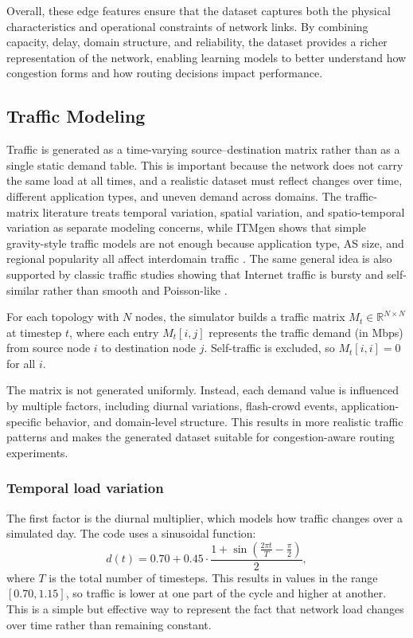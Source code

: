 \documentclass[12pt]{article}
\begin{document}
Overall, these edge features ensure that the dataset captures both the physical characteristics and operational constraints of network links. By combining capacity, delay, domain structure, and reliability, the dataset provides a richer representation of the network, enabling learning models to better understand how congestion forms and how routing decisions impact performance.

\subsection{Traffic Modeling}
Traffic is generated as a time-varying source–destination matrix rather than as a single static demand table. This is important because the network does not carry the same load at all times, and a realistic dataset must reflect changes over time, different application types, and uneven demand across domains. The traffic-matrix literature treats temporal variation, spatial variation, and spatio-temporal variation as separate modeling concerns, while ITMgen shows that simple gravity-style traffic models are not enough because application type, AS size, and regional popularity all affect interdomain traffic \cite{itmgen}. The same general idea is also supported by classic traffic studies showing that Internet traffic is bursty and self-similar rather than smooth and Poisson-like \cite{ethernetTraffic}.

For each topology with $N$ nodes, the simulator builds a traffic matrix 
$M_t \in \mathbb{R}^{N \times N}$ at timestep $t$, where each entry 
$M_t[i,j]$ represents the traffic demand (in Mbps) from source node $i$ 
to destination node $j$. Self-traffic is excluded, so 
$M_t[i,i] = 0$ for all $i$.

The matrix is not generated uniformly. Instead, each demand value is 
influenced by multiple factors, including diurnal variations, 
flash-crowd events, application-specific behavior, and domain-level 
structure. This results in more realistic traffic patterns and makes 
the generated dataset suitable for congestion-aware routing experiments.

\subsubsection{Temporal load variation}
The first factor is the diurnal multiplier, which models how traffic changes over a simulated day. The code uses a sinusoidal function:
\[
d(t) = 0.70 + 0.45 \cdot \frac{1 + \sin\left(\frac{2\pi t}{T} - \frac{\pi}{2}\right)}{2},
\]
where $T$ is the total number of timesteps. This results in values in the range $[0.70, 1.15]$, so traffic is lower at one part of the cycle and higher at another. This is a simple but effective way to represent the fact that network load changes over time rather than remaining constant.
\end{document}
